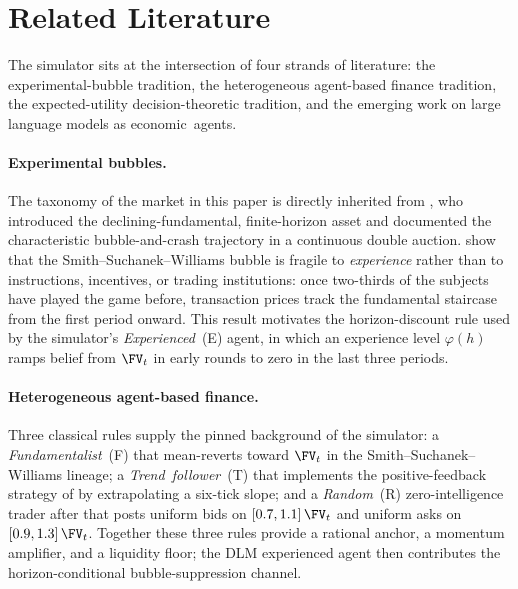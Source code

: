 \section{Related Literature}
\label{sec:lit}

The simulator sits at the intersection of four strands of
literature: the experimental-bubble tradition, the heterogeneous
agent-based finance tradition, the expected-utility decision-theoretic
tradition, and the emerging work on large language models as
economic~agents.

\paragraph{Experimental bubbles.} The taxonomy of the market
in this paper is directly inherited from \citet{smith1988bubbles},
who introduced the declining-fundamental, finite-horizon asset and
documented the characteristic bubble-and-crash trajectory in a
continuous double auction. \citet{dufwenberg2005bubbles} show that
the Smith--Suchanek--Williams bubble is fragile to \emph{experience}
rather than to instructions, incentives, or trading institutions:
once two-thirds of the subjects have played the game before,
transaction prices track the fundamental staircase from the first
period onward. This result motivates the horizon-discount rule used
by the simulator's \emph{Experienced}~(E) agent, in which an
experience level $\varphi(h)$ ramps belief from $\FV_t$ in early
rounds to zero in the last three periods.

\paragraph{Heterogeneous agent-based finance.} Three classical
rules supply the pinned background of the simulator: a
\emph{Fundamentalist}~(F) that mean-reverts toward $\FV_t$ in the
Smith--Suchanek--Williams lineage; a \emph{Trend~follower}~(T) that
implements the positive-feedback strategy of
\citet{delong1990positive} by extrapolating a six-tick slope; and
a \emph{Random}~(R) zero-intelligence trader after
\citet{gode1993allocative} that posts uniform bids on
$[0.7,1.1]\,\FV_t$ and uniform asks on $[0.9,1.3]\,\FV_t$.
Together these three rules provide a rational anchor, a momentum
amplifier, and a liquidity floor; the DLM experienced agent then
contributes the horizon-conditional bubble-suppression channel.

